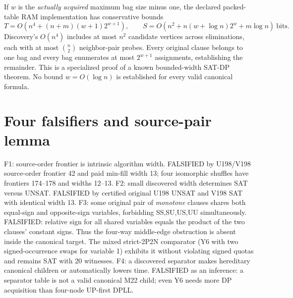 \documentclass[11pt]{article}
\begin{document}
If $w$ is the \emph{actually acquired} maximum bag size minus one, the declared packed-table RAM implementation has conservative bounds
\[
T=O(n^4+(n+m)(w+1)2^{w+1}),\qquad
S=O(n^2+n(w+\log n)2^w+m\log n)\ \text{bits}.
\]
Discovery's $O(n^4)$ includes at most $n^2$ candidate vertices across eliminations, each with at most $\binom n2$ neighbor-pair probes. Every original clause belongs to one bag and every bag enumerates at most $2^{w+1}$ assignments, establishing the remainder. This is a specialized proof of a known bounded-width SAT-DP theorem. No bound $w=O(\log n)$ is established for every valid canonical formula.

\section{Four falsifiers and source-pair lemma}
F1: source-order frontier is intrinsic algorithm width. FALSIFIED by U198/V198 source-order frontier 42 and paid min-fill width 13; four isomorphic shuffles have frontiers 174--178 and widths 12--13.
F2: small discovered width determines SAT versus UNSAT. FALSIFIED by certified original U198 UNSAT and V198 SAT with identical width 13.
F3: some original pair of \emph{monotone} clauses shares both equal-sign and opposite-sign variables, forbidding SS,SU,US,UU simultaneously. FALSIFIED: relative sign for all shared variables equals the product of the two clauses' constant signs. Thus the four-way middle-edge obstruction is absent inside the canonical target. The mixed strict-2P2N comparator (Y6 with two signed-occurrence swaps for variable 1) exhibits it without violating signed quotas and remains SAT with 20 witnesses.
F4: a discovered separator makes hereditary canonical children or automatically lowers time. FALSIFIED as an inference: a separator table is not a valid canonical M22 child; even Y6 needs more DP acquisition than four-node UP-first DPLL.
\end{document}
